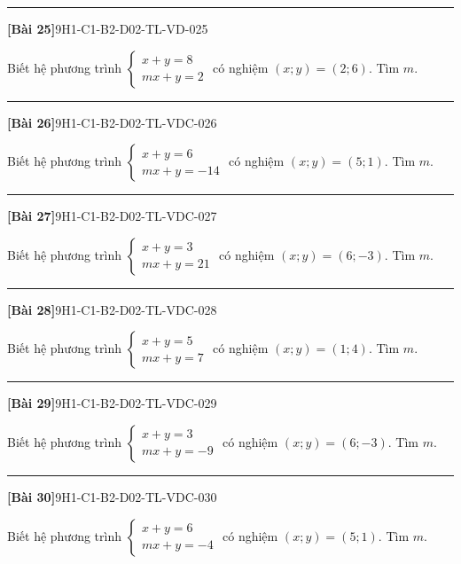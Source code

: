 \documentclass[12pt,a4paper]{article}
\newif\ifloigiai
\newenvironment{cauhoi}[2]{%
  \par\medskip\noindent\rule{\textwidth}{0.4pt}\par\nopagebreak
  \noindent\textbf{[#1]}\hfill{\scriptsize\ttfamily #2}\par\nopagebreak\smallskip}{\par}
\newcommand{\loigiai}[1]{\ifloigiai\par\smallskip\noindent\textit{Lời giải.} #1\par\fi}
\begin{document}
\begin{cauhoi}{Bài 25}{9H1-C1-B2-D02-TL-VD-025}
Biết hệ phương trình $\begin{cases}x+y=8\\ mx+y=2\end{cases}$ có nghiệm $(x;y)=(2;6)$. Tìm $m$.
\loigiai{Thay $x=2$, $y=6$ vào phương trình thứ hai: $2 m+6=2$ nên $m=\dfrac{2-6}{2}=-2$.}
\end{cauhoi}
\begin{cauhoi}{Bài 26}{9H1-C1-B2-D02-TL-VDC-026}
Biết hệ phương trình $\begin{cases}x+y=6\\ mx+y=-14\end{cases}$ có nghiệm $(x;y)=(5;1)$. Tìm $m$.
\loigiai{Thay $x=5$, $y=1$ vào phương trình thứ hai: $5 m+1=-14$ nên $m=\dfrac{-14-1}{5}=-3$.}
\end{cauhoi}
\begin{cauhoi}{Bài 27}{9H1-C1-B2-D02-TL-VDC-027}
Biết hệ phương trình $\begin{cases}x+y=3\\ mx+y=21\end{cases}$ có nghiệm $(x;y)=(6;-3)$. Tìm $m$.
\loigiai{Thay $x=6$, $y=-3$ vào phương trình thứ hai: $6 m-3=21$ nên $m=\dfrac{21+3}{6}=4$.}
\end{cauhoi}
\begin{cauhoi}{Bài 28}{9H1-C1-B2-D02-TL-VDC-028}
Biết hệ phương trình $\begin{cases}x+y=5\\ mx+y=7\end{cases}$ có nghiệm $(x;y)=(1;4)$. Tìm $m$.
\loigiai{Thay $x=1$, $y=4$ vào phương trình thứ hai: $1 m+4=7$ nên $m=\dfrac{7-4}{1}=3$.}
\end{cauhoi}
\begin{cauhoi}{Bài 29}{9H1-C1-B2-D02-TL-VDC-029}
Biết hệ phương trình $\begin{cases}x+y=3\\ mx+y=-9\end{cases}$ có nghiệm $(x;y)=(6;-3)$. Tìm $m$.
\loigiai{Thay $x=6$, $y=-3$ vào phương trình thứ hai: $6 m-3=-9$ nên $m=\dfrac{-9+3}{6}=-1$.}
\end{cauhoi}
\begin{cauhoi}{Bài 30}{9H1-C1-B2-D02-TL-VDC-030}
Biết hệ phương trình $\begin{cases}x+y=6\\ mx+y=-4\end{cases}$ có nghiệm $(x;y)=(5;1)$. Tìm $m$.
\loigiai{Thay $x=5$, $y=1$ vào phương trình thứ hai: $5 m+1=-4$ nên $m=\dfrac{-4-1}{5}=-1$.}
\end{cauhoi}
\end{document}
